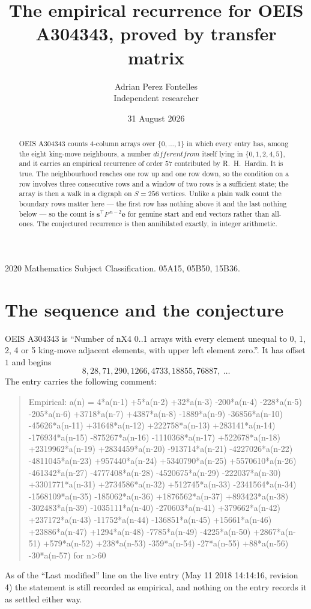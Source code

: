 \documentclass[11pt,a4paper]{article}
\title{The empirical recurrence for OEIS A304343, proved by transfer matrix}
\author{Adrian Perez Fontelles\\ \small Independent researcher}
\date{31 August 2026}
\theoremstyle{plain}
\theoremstyle{definition}
\begin{document}
\maketitle

\begin{abstract}
OEIS A304343 counts $4$-column arrays over $\{0,\dots,1\}$ in which every entry has,
among the eight king-move neighbours, a number $different from$ itself lying in $\{0,1,2,4,5\}$, and it carries an empirical
recurrence of order $57$ contributed by R.~H.~Hardin. It is true. The neighbourhood
reaches one row up and one row down, so the condition on a row involves three consecutive
rows and a window of two rows is a sufficient state; the array is then a walk in a digraph
on $S=256$ vertices. Unlike a plain walk count the boundary rows matter here --- the first
row has nothing above it and the last nothing below --- so the count is
$\mathbf{s}^{\!\top}P^{\,n-2}\mathbf{e}$ for genuine start and end vectors rather than
all-ones. The conjectured recurrence is then annihilated exactly, in integer arithmetic.
\end{abstract}

\noindent\small 2020 Mathematics Subject Classification. 05A15, 05B50, 15B36.\normalsize

\section{The sequence and the conjecture}

OEIS A304343 is ``Number of nX4 0..1 arrays with every element unequal to 0, 1, 2, 4 or 5 king-move adjacent elements, with upper left element zero.''. It has offset
$1$ and begins
\[
8, 28, 71, 290, 1266, 4733, 18855, 76887,\ \dots
\]
The entry carries the following comment:
\begin{quote}\small
Empirical: a(n) = 4*a(n-1) +5*a(n-2) +32*a(n-3) -200*a(n-4) -228*a(n-5) -205*a(n-6) +3718*a(n-7) +4387*a(n-8) -1889*a(n-9) -36856*a(n-10) -45626*a(n-11) +31648*a(n-12) +222758*a(n-13) +283141*a(n-14) -176934*a(n-15) -875267*a(n-16) -1110368*a(n-17) +522678*a(n-18) +2319962*a(n-19) +2834459*a(n-20) -913714*a(n-21) -4227026*a(n-22) -4811045*a(n-23) +957440*a(n-24) +5340790*a(n-25) +5570610*a(n-26) -461342*a(n-27) -4777408*a(n-28) -4520675*a(n-29) -222037*a(n-30) +3301771*a(n-31) +2734586*a(n-32) +512745*a(n-33) -2341564*a(n-34) -1568109*a(n-35) -185062*a(n-36) +1876562*a(n-37) +893423*a(n-38) -302483*a(n-39) -1035111*a(n-40) -270603*a(n-41) +379662*a(n-42) +237172*a(n-43) -11752*a(n-44) -136851*a(n-45) +15661*a(n-46) +23886*a(n-47) +1294*a(n-48) -7785*a(n-49) -4225*a(n-50) +2867*a(n-51) +579*a(n-52) +238*a(n-53) -359*a(n-54) -27*a(n-55) +88*a(n-56) -30*a(n-57) for n>60
\end{quote}
As of the ``Last modified'' line on the live entry (May 11 2018 14:14:16, revision
4) the statement is still recorded as empirical, and nothing on the entry
records it as settled either way.
\end{document}
